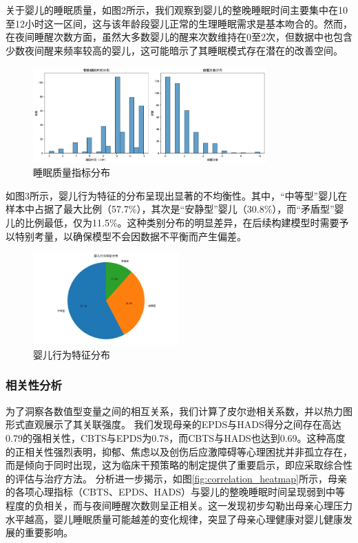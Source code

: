 \documentclass[withoutpreface,bwprint]{cumcmthesis}
\begin{document}
关于婴儿的睡眠质量，如图2所示，我们观察到婴儿的整晚睡眠时间主要集中在10至12小时这一区间，这与该年龄段婴儿正常的生理睡眠需求是基本吻合的。然而，在夜间睡醒次数方面，虽然大多数婴儿的醒来次数维持在0至2次，但数据中也包含少数夜间醒来频率较高的婴儿，这可能暗示了其睡眠模式存在潜在的改善空间。

\begin{figure}[htbp]
    \centering
    \includegraphics[width=0.8\textwidth]{figures/sleep_quality_distribution.png}
    \caption{睡眠质量指标分布}
    \label{fig:sleep_quality_distribution}
\end{figure}

如图3所示，婴儿行为特征的分布呈现出显著的不均衡性。其中，“中等型”婴儿在样本中占据了最大比例（57.7\%），其次是“安静型”婴儿（30.8\%），而“矛盾型”婴儿的比例最低，仅为11.5\%。这种类别分布的明显差异，在后续构建模型时需要予以特别考量，以确保模型不会因数据不平衡而产生偏差。

\begin{figure}[htbp]
    \centering
    \includegraphics[width=0.5\textwidth]{figures/baby_behavior_distribution.png}
    \caption{婴儿行为特征分布}
    \label{fig:baby_behavior_distribution}
\end{figure}

\subsubsection{相关性分析}
为了洞察各数值型变量之间的相互关系，我们计算了皮尔逊相关系数，并以热力图形式直观展示了其关联强度。
我们发现母亲的EPDS与HADS得分之间存在高达0.79的强相关性，CBTS与EPDS为0.78，而CBTS与HADS也达到0.69。这种高度的正相关性强烈表明，抑郁、焦虑以及创伤后应激障碍等心理困扰并非孤立存在，而是倾向于同时出现，这为临床干预策略的制定提供了重要启示，即应采取综合性的评估与治疗方法。
分析进一步揭示，如图\ref{fig:correlation_heatmap}所示，母亲的各项心理指标（CBTS、EPDS、HADS）与婴儿的整晚睡眠时间呈现弱到中等程度的负相关，而与夜间睡醒次数则呈正相关。这一发现初步勾勒出母亲心理压力水平越高，婴儿睡眠质量可能越差的变化规律，突显了母亲心理健康对婴儿健康发展的重要影响。
\end{document}
